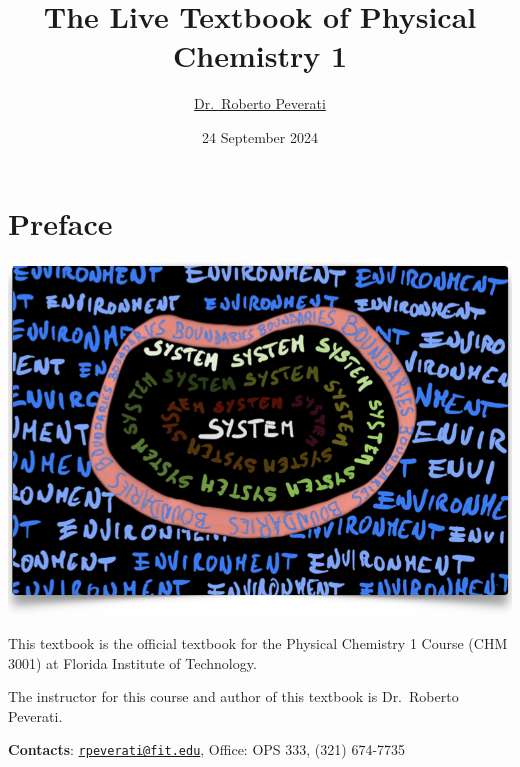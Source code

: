 \documentclass[
  9pt,
]{extbook}
\title{The Live Textbook of Physical Chemistry 1}
\author{\href{mailto:rpeverati@fit.edu}{Dr.~Roberto Peverati}}
\date{24 September 2024}
\let\oldmaketitle\maketitle
\theoremstyle{definition}
\theoremstyle{definition}
\theoremstyle{definition}
\theoremstyle{definition}
\theoremstyle{remark}
\begin{document}
\maketitle


%
\newpage

\let\maketitle\oldmaketitle

\renewcommand\thepage{\romannumeral\numexpr\value{page}-1\relax}


{
\setcounter{tocdepth}{1}
\tableofcontents
}
\renewcommand{\arraystretch}{1.8}

\chapter*{Preface}\label{preface}

\begin{center}\includegraphics[width=0.8\linewidth]{./img/OEP_Figures.000} \end{center}

This textbook is the official textbook for the Physical Chemistry 1 Course (CHM 3001) at Florida Institute of Technology.

The instructor for this course and author of this textbook is Dr.~Roberto Peverati.

\textbf{Contacts}: \href{mailto:rpeverati@fit.edu}{\nolinkurl{rpeverati@fit.edu}}, Office: OPS 333, (321) 674-7735
\end{document}
